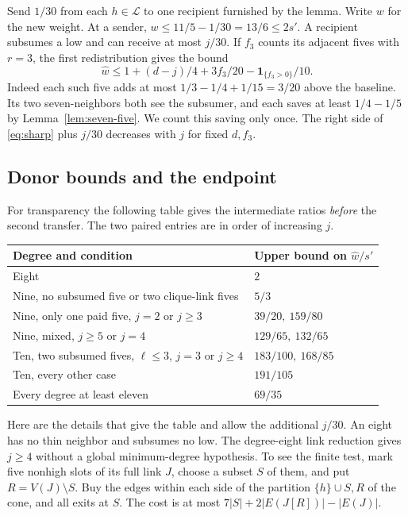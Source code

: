 \documentclass[11pt,a4paper]{amsart}
\newcommand{\LL}{\mathcal L}
\newcommand{\ind}{\mathbf 1}
\newcommand{\wt}{\widehat w}
\begin{document}
Send $1/30$ from each $h\in\LL$ to one recipient furnished by the
lemma. Write $w$ for the new weight. At a sender,
$w\le11/5-1/30=13/6\le2s'$. A recipient subsumes a low and can
receive at most $j/30$. If $f_3$ counts its adjacent fives with
$r=3$, the first redistribution gives the bound
\begin{equation}\label{eq:sharp}
 \wt\le1+(d-j)/4+3f_3/20-\ind_{\{f_3>0\}}/10 .
\end{equation}
Indeed each such five adds at most $1/3-1/4+1/15=3/20$ above
the baseline. Its two seven-neighbors both see the subsumer, and
each saves at least $1/4-1/5$ by Lemma~\ref{lem:seven-five}.
We count this saving only once. The right side of
\eqref{eq:sharp} plus $j/30$ decreases with $j$ for fixed $d,f_3$.

\subsection{Donor bounds and the endpoint}
For transparency the following table gives the intermediate
ratios \emph{before} the second transfer. The two paired entries
are in order of increasing $j$.
\begin{center}\small
\begin{tabular}{@{}ll@{}}\hline
Degree and condition & Upper bound on $\wt/s'$\\ \hline
Eight & $2$\\
Nine, no subsumed five or two clique-link fives & $5/3$\\
Nine, only one paid five, $j=2$ or $j\ge3$ & $39/20,\ 159/80$\\
Nine, mixed, $j\ge5$ or $j=4$ & $129/65,\ 132/65$\\
Ten, two subsumed fives, $\ell\le3$, $j=3$ or $j\ge4$ & $183/100,\ 168/85$\\
Ten, every other case & $191/105$\\
Every degree at least eleven & $69/35$\\ \hline
\end{tabular}
\end{center}
Here are the details that give the table and allow the additional
$j/30$. An eight has no thin neighbor and subsumes no low.
The degree-eight link reduction gives $j\ge4$ without a global
minimum-degree hypothesis. To see the finite test, mark five
nonhigh slots of its full link $J$, choose a subset $S$ of them,
and put $R=V(J)\setminus S$. Buy the edges within each side of
the partition $\{h\}\cup S,R$ of the cone, and all exits at $S$.
The cost is at most $7|S|+2|E(J[R])|-|E(J)|$.
\end{document}

